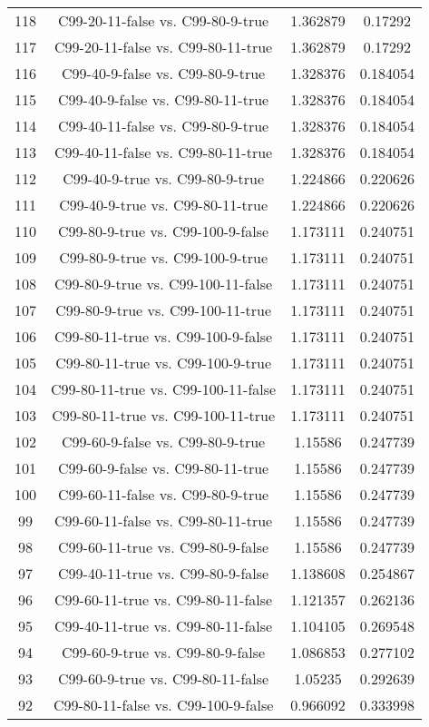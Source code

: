 \documentclass[a4paper,10pt]{article}
\begin{document}
\begin{landscape}
\begin{table}[!htp]
\begin{tabular}{cccc}
118&C99-20-11-false vs. C99-80-9-true&1.362879&0.17292\\
117&C99-20-11-false vs. C99-80-11-true&1.362879&0.17292\\
116&C99-40-9-false vs. C99-80-9-true&1.328376&0.184054\\
115&C99-40-9-false vs. C99-80-11-true&1.328376&0.184054\\
114&C99-40-11-false vs. C99-80-9-true&1.328376&0.184054\\
113&C99-40-11-false vs. C99-80-11-true&1.328376&0.184054\\
112&C99-40-9-true vs. C99-80-9-true&1.224866&0.220626\\
111&C99-40-9-true vs. C99-80-11-true&1.224866&0.220626\\
110&C99-80-9-true vs. C99-100-9-false&1.173111&0.240751\\
109&C99-80-9-true vs. C99-100-9-true&1.173111&0.240751\\
108&C99-80-9-true vs. C99-100-11-false&1.173111&0.240751\\
107&C99-80-9-true vs. C99-100-11-true&1.173111&0.240751\\
106&C99-80-11-true vs. C99-100-9-false&1.173111&0.240751\\
105&C99-80-11-true vs. C99-100-9-true&1.173111&0.240751\\
104&C99-80-11-true vs. C99-100-11-false&1.173111&0.240751\\
103&C99-80-11-true vs. C99-100-11-true&1.173111&0.240751\\
102&C99-60-9-false vs. C99-80-9-true&1.15586&0.247739\\
101&C99-60-9-false vs. C99-80-11-true&1.15586&0.247739\\
100&C99-60-11-false vs. C99-80-9-true&1.15586&0.247739\\
99&C99-60-11-false vs. C99-80-11-true&1.15586&0.247739\\
98&C99-60-11-true vs. C99-80-9-false&1.15586&0.247739\\
97&C99-40-11-true vs. C99-80-9-false&1.138608&0.254867\\
96&C99-60-11-true vs. C99-80-11-false&1.121357&0.262136\\
95&C99-40-11-true vs. C99-80-11-false&1.104105&0.269548\\
94&C99-60-9-true vs. C99-80-9-false&1.086853&0.277102\\
93&C99-60-9-true vs. C99-80-11-false&1.05235&0.292639\\
92&C99-80-11-false vs. C99-100-9-false&0.966092&0.333998\\

\end{tabular}
\end{table}
\end{landscape}
\end{document}
